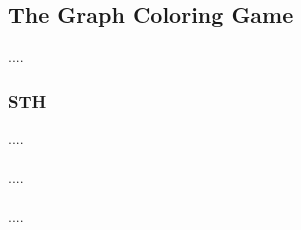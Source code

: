 \subsection{The Graph Coloring Game}

\begin{flushleft}
    ....
\end{flushleft}

\subsubsection{STH}

\begin{flushleft}
    ....\\~\\

    ....\\~\\
    
    ....\\~\\
\end{flushleft}